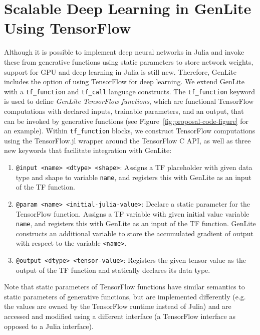 \documentclass{article}
\begin{document}
\section{Scalable Deep Learning in GenLite Using TensorFlow}
Although it is possible to implement deep neural networks in Julia and invoke these from generative functions using static parameters to store network weights, support for GPU and deep learning in Julia is still new.
Therefore, GenLite includes the option of using TensorFlow for deep learning.
We extend GenLite with a \texttt{tf\_function} and \texttt{tf\_call} language constructs.
The \texttt{tf\_function} keyword is used to define \emph{GenLite TensorFlow functions}, which are functional TensorFlow computations with declared inputs, trainable parameters, and an output, that can be invoked by generative functions (see Figure~\ref{fig:proposal-code-figure} for an example).
Within \texttt{tf\_function} blocks, we construct TensorFlow computations using the TensorFlow.jl \cite{?} wrapper around the TensorFlow C API, as well as three new keywords that facilitate integration with GenLite:
\begin{enumerate}
\item \texttt{@input <name> <dtype> <shape>}:
Assigns a TF placeholder with given data type and shape to variable \texttt{name}, and registers this with GenLite as an input of the TF function.
\item \texttt{@param <name> <initial-julia-value>}:
Declare a static parameter for the TensorFlow function.
Assigns a TF variable with given initial value variable \texttt{name}, and registers this with GenLite as an input of the TF function.
GenLite constructs an additional variable to store the accumulated gradient of output with respect to the variable \texttt{<name>}.
\item \texttt{@output <dtype> <tensor-value>}:
Registers the given tensor value as the output of the TF function and statically declares its data type.
\end{enumerate}
Note that static parameters of TensorFlow functions have similar semantics to static parameters of generative functions, but are implemented differently (e.g. the values are owned by the TensorFlow runtime instead of Julia) and are accessed and modified using a different interface (a TensorFlow interface as opposed to a Julia interface).
\end{document}
